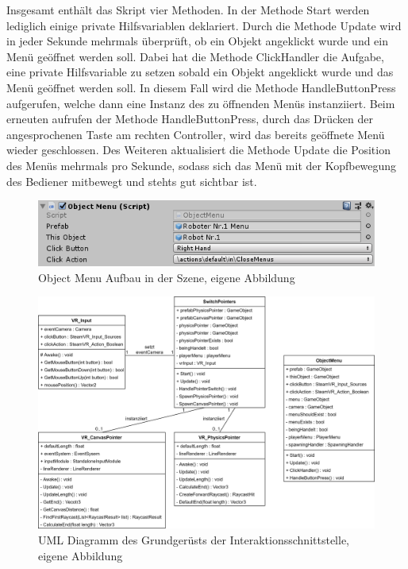 \newline
Insgesamt enthält das Skript vier Methoden. In der Methode Start werden lediglich einige private Hilfsvariablen deklariert. Durch die Methode Update wird in jeder Sekunde mehrmals überprüft, ob ein Objekt angeklickt wurde und ein Menü geöffnet werden soll. Dabei hat die Methode ClickHandler die Aufgabe, eine private Hilfsvariable zu setzen sobald ein Objekt angeklickt wurde und das Menü geöffnet werden soll. In diesem Fall wird die Methode HandleButtonPress aufgerufen, welche dann eine Instanz des zu öffnenden Menüs instanziiert. Beim erneuten aufrufen der Methode HandleButtonPress, durch das Drücken der angesprochenen Taste am rechten Controller, wird das bereits geöffnete Menü wieder geschlossen. Des Weiteren aktualisiert die Methode Update die Position des Menüs mehrmals pro Sekunde, sodass sich das Menü mit der Kopfbewegung des Bediener mitbewegt und stehts gut sichtbar ist.
\begin{figure}[h]
	\centering
	\includegraphics[width=0.6\linewidth]{Bilder/A46_ObjectMenu}
	\caption{Object Menu Aufbau in der Szene, eigene Abbildung}
	\label{fig:ObjectMenu}
\end{figure}
\begin{figure}[h]
	\centering
	\includegraphics[width=1\linewidth]{Bilder/A48_InteraktionUML1}
	\caption{UML Diagramm des Grundgerüsts der Interaktionsschnittstelle, eigene Abbildung}
	\label{fig:UMLInteraktion}
\end{figure}

